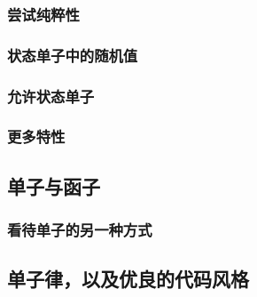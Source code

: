 \documentclass[./main.tex]{subfiles}
\begin{document}

\subsubsection*{尝试纯粹性}

\subsubsection*{状态单子中的随机值}

\subsubsection*{允许状态单子}

\subsubsection*{更多特性}

\subsection*{单子与函子}

\subsubsection*{看待单子的另一种方式}

\subsection*{单子律，以及优良的代码风格}
\end{document}
